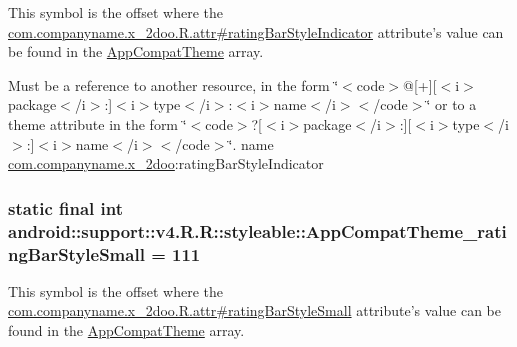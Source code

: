 This symbol is the offset where the \hyperlink{classcom_1_1companyname_1_1x__2doo_1_1_r_1_1attr_16b27dcf0ce3da3e079dedb114df7aa7}{com.companyname.x\_\-2doo.R.attr\#ratingBarStyleIndicator} attribute's value can be found in the \hyperlink{classandroid_1_1support_1_1v4_1_1_r_1_1styleable_0873e92ba21076bb5a4aeadeb7f5779f}{AppCompatTheme} array.

Must be a reference to another resource, in the form \char`\"{}$<$code$>$@\mbox{[}+\mbox{]}\mbox{[}$<$i$>$package$<$/i$>$:\mbox{]}$<$i$>$type$<$/i$>$:$<$i$>$name$<$/i$>$$<$/code$>$\char`\"{} or to a theme attribute in the form \char`\"{}$<$code$>$?\mbox{[}$<$i$>$package$<$/i$>$:\mbox{]}\mbox{[}$<$i$>$type$<$/i$>$:\mbox{]}$<$i$>$name$<$/i$>$$<$/code$>$\char`\"{}.  name \hyperlink{namespacecom_1_1companyname_1_1x__2doo}{com.companyname.x\_\-2doo}:ratingBarStyleIndicator \hypertarget{classandroid_1_1support_1_1v4_1_1_r_1_1styleable_267c7cd6a0c6a2c317ac9a33722b06eb}{
\subsubsection[{AppCompatTheme\_\-ratingBarStyleSmall}]{\setlength{\rightskip}{0pt plus 5cm}static final int android::support::v4.R.R::styleable::AppCompatTheme\_\-ratingBarStyleSmall = 111}}
\label{classandroid_1_1support_1_1v4_1_1_r_1_1styleable_267c7cd6a0c6a2c317ac9a33722b06eb}


This symbol is the offset where the \hyperlink{classcom_1_1companyname_1_1x__2doo_1_1_r_1_1attr_30b34833def57985801157eacfd32759}{com.companyname.x\_\-2doo.R.attr\#ratingBarStyleSmall} attribute's value can be found in the \hyperlink{classandroid_1_1support_1_1v4_1_1_r_1_1styleable_0873e92ba21076bb5a4aeadeb7f5779f}{AppCompatTheme} array.

